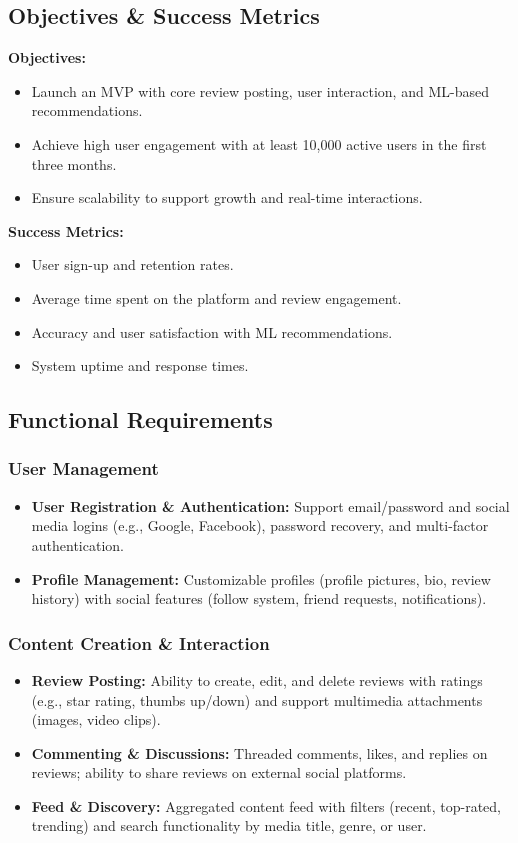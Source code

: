 \documentclass[11pt]{article}
\begin{document}
\subsection{Objectives \& Success Metrics}
\textbf{Objectives:}
\begin{itemize}[noitemsep]
    \item Launch an MVP with core review posting, user interaction, and ML-based recommendations.
    \item Achieve high user engagement with at least 10,000 active users in the first three months.
    \item Ensure scalability to support growth and real-time interactions.
\end{itemize}
\textbf{Success Metrics:}
\begin{itemize}[noitemsep]
    \item User sign-up and retention rates.
    \item Average time spent on the platform and review engagement.
    \item Accuracy and user satisfaction with ML recommendations.
    \item System uptime and response times.
\end{itemize}

\subsection{Functional Requirements}
\subsubsection{User Management}
\begin{itemize}[noitemsep]
    \item \textbf{User Registration \& Authentication:} Support email/password and social media logins (e.g., Google, Facebook), password recovery, and multi-factor authentication.
    \item \textbf{Profile Management:} Customizable profiles (profile pictures, bio, review history) with social features (follow system, friend requests, notifications).
\end{itemize}

\subsubsection{Content Creation \& Interaction}
\begin{itemize}[noitemsep]
    \item \textbf{Review Posting:} Ability to create, edit, and delete reviews with ratings (e.g., star rating, thumbs up/down) and support multimedia attachments (images, video clips).
    \item \textbf{Commenting \& Discussions:} Threaded comments, likes, and replies on reviews; ability to share reviews on external social platforms.
    \item \textbf{Feed \& Discovery:} Aggregated content feed with filters (recent, top-rated, trending) and search functionality by media title, genre, or user.
\end{itemize}
\end{document}

